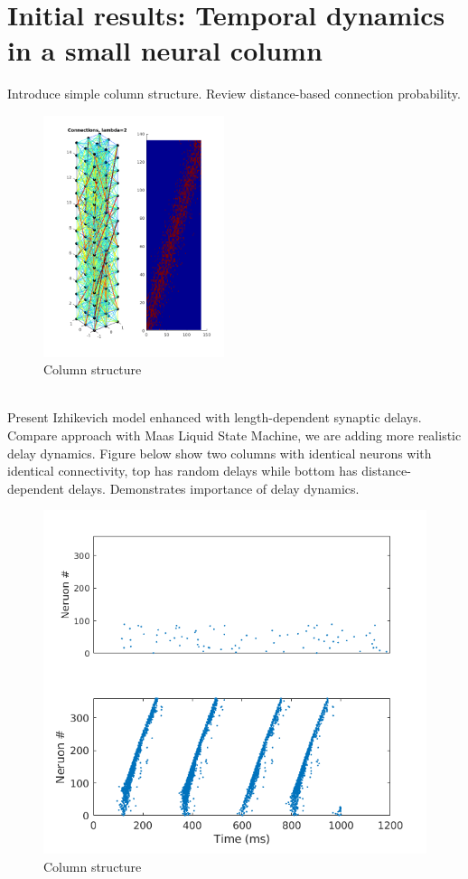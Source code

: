 \documentclass[a4paper,11pt]{article}
\numberwithin{equation}{section}
\begin{document}
\section{Initial results: Temporal dynamics in a small neural column}
Introduce simple column structure.
Review distance-based connection probability.
\\
\begin{figure}
 \caption{Column structure}
 \centering
   \includegraphics[width=200px]{fig/lambda2}
\end{figure}
\\
Present Izhikevich model enhanced with length-dependent synaptic delays.
Compare approach with Maas Liquid State Machine, we are adding more realistic delay dynamics.
Figure below show two columns with identical neurons with identical connectivity, top has random delays while bottom has distance-dependent delays.
Demonstrates importance of delay dynamics.
\\
\begin{figure}
 \caption{Column structure}
 \centering
   \includegraphics[width=\textwidth]{fig/DelayCompare_RandInput}
\end{figure}
\\
\end{document}
